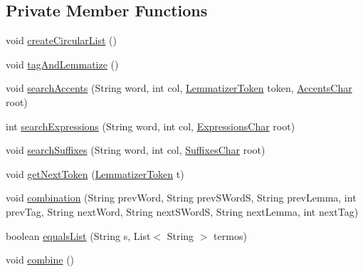 \subsection*{Private Member Functions}
\begin{DoxyCompactItemize}
\item 
void \hyperlink{classbr_1_1usp_1_1cata_1_1util_1_1lemmatizer_1_1_lemmatizer_ad7b043ad04681a39fd810dbac57e7847}{create\+Circular\+List} ()
\item 
void \hyperlink{classbr_1_1usp_1_1cata_1_1util_1_1lemmatizer_1_1_lemmatizer_aa5df3e813c815846be9df216bf8a310c}{tag\+And\+Lemmatize} ()
\item 
void \hyperlink{classbr_1_1usp_1_1cata_1_1util_1_1lemmatizer_1_1_lemmatizer_a88a3b30c426c36ce6c8761b10a78ef6a}{search\+Accents} (String word, int col, \hyperlink{classbr_1_1usp_1_1cata_1_1util_1_1lemmatizer_1_1_lemmatizer_token}{Lemmatizer\+Token} token, \hyperlink{classbr_1_1usp_1_1cata_1_1util_1_1lemmatizer_1_1_accents_char}{Accents\+Char} root)
\item 
int \hyperlink{classbr_1_1usp_1_1cata_1_1util_1_1lemmatizer_1_1_lemmatizer_a71b958dadcfdbeb20f69fa6252f59331}{search\+Expressions} (String word, int col, \hyperlink{classbr_1_1usp_1_1cata_1_1util_1_1lemmatizer_1_1_expressions_char}{Expressions\+Char} root)
\item 
void \hyperlink{classbr_1_1usp_1_1cata_1_1util_1_1lemmatizer_1_1_lemmatizer_a41af9a37ecfd9ec9ff395ceb74d82b0e}{search\+Suffixes} (String word, int col, \hyperlink{classbr_1_1usp_1_1cata_1_1util_1_1lemmatizer_1_1_suffixes_char}{Suffixes\+Char} root)
\item 
void \hyperlink{classbr_1_1usp_1_1cata_1_1util_1_1lemmatizer_1_1_lemmatizer_a926777c572133ea4ee88381a0d5c9d67}{get\+Next\+Token} (\hyperlink{classbr_1_1usp_1_1cata_1_1util_1_1lemmatizer_1_1_lemmatizer_token}{Lemmatizer\+Token} t)
\item 
void \hyperlink{classbr_1_1usp_1_1cata_1_1util_1_1lemmatizer_1_1_lemmatizer_adbd5fccfe564bfe05ee2888e0c1e92c1}{combination} (String prev\+Word, String prev\+S\+Word\+S, String prev\+Lemma, int prev\+Tag, String next\+Word, String next\+S\+Word\+S, String next\+Lemma, int next\+Tag)
\item 
boolean \hyperlink{classbr_1_1usp_1_1cata_1_1util_1_1lemmatizer_1_1_lemmatizer_afb04d19efc0f4bf91706e9851c6ae41e}{equals\+List} (String s, List$<$ String $>$ termos)
\item 
void \hyperlink{classbr_1_1usp_1_1cata_1_1util_1_1lemmatizer_1_1_lemmatizer_aa7905b75203df591311226f266c6b59e}{combine} ()

\end{DoxyCompactItemize}
